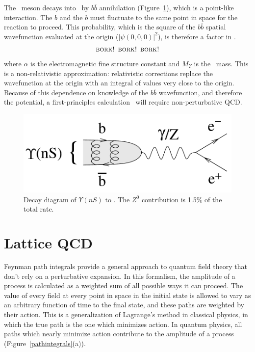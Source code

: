 \documentclass{cornell}
\begin{document}
The \ups\ meson decays into \ee\ by $b\bar{b}$ annihilation
(Figure~\ref{diagramgee}), which is a point-like interaction.  The $b$
and the $\bar{b}$ must fluctuate to the same point in space for the
reaction to proceed.  This probability, which is the square of the
$b\bar{b}$ spatial wavefunction evaluated at the origin
($|\psi(0,0,0)|^2$), is therefore a factor in \gee.
\begin{equation}
  \mbox{\sc bork! bork! bork!}
  \label{eqn:waveatorigin}
\end{equation}
where $\alpha$ is the electromagnetic fine structure constant and
$M_\Upsilon$ is the \ups\ mass.  This is a non-relativistic
approximation: relativistic corrections replace the wavefunction at
the origin with an integral of values very close to the origin.
Because of this dependence on knowledge of the $b\bar{b}$
wavefunction, and therefore the potential, a first-principles
calculation \gee\ will require non-perturbative QCD.

\begin{figure}[p]
  \begin{center}
    \includegraphics[width=0.5\linewidth]{plots/diagramgee}
  \end{center}
  \caption{\label{diagramgee} Decay diagram of $\Upsilon(nS)$ to \ee.
  The $Z^0$ contribution is 1.5\% of the total rate.}
\end{figure}

\section{Lattice QCD}

Feynman path integrals provide a general approach to quantum field
theory that don't rely on a perturbative expansion.  In this
formalism, the amplitude of a process is calculated as a weighted sum
of all possible ways it can proceed.  The value of every field at
every point in space in the initial state is allowed to vary as an
arbitrary function of time to the final state, and these paths are
weighted by their action.  This is a generalization of Lagrange's
method in classical physics, in which the true path is the one which
minimizes action.  In quantum physics, all paths which nearly minimize
action contribute to the amplitude of a process (Figure~\ref{pathintegrals}(a)).
\end{document}
